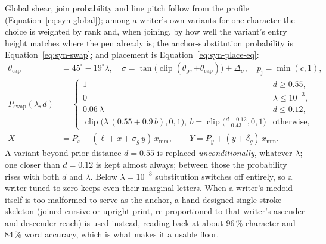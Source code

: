 Global shear, join probability and line pitch follow from the profile (Equation~\ref{eq:syn-global}); among a writer's own variants for one character the choice is weighted by rank and, when joining, by how well the variant's entry height matches where the pen already is; the anchor-substitution probability is Equation~\ref{eq:syn-swap}; and placement is Equation~\ref{eq:syn-place-eq}:
\begin{align}
\theta_{\mathrm{cap}}&=45^\circ-19^\circ\lambda,\quad\sigma=\tan\!\bigl(\operatorname{clip}(\theta_{\mathrm p},\pm\theta_{\mathrm{cap}})\bigr)+\Delta_\sigma,\quad p_{\mathrm j}=\min(c,1),\label{eq:syn-global}\\
P_{\mathrm{swap}}(\lambda,d)&=\begin{cases}1&d\ge0.55,\\0&\lambda\le10^{-3},\\0.06\,\lambda&d\le0.12,\\\operatorname{clip}\bigl(\lambda\,(0.55+0.9\,b),0,1\bigr),\ b=\operatorname{clip}\bigl(\tfrac{d-0.12}{0.43},0,1\bigr)&\text{otherwise,}\end{cases}\label{eq:syn-swap}\\
X&=P_x+(\ell+x+\sigma_g\,y)\,x_{\mathrm{mm}},\qquad Y=P_y+(y+\delta_g)\,x_{\mathrm{mm}}.\label{eq:syn-place-eq}
\end{align}
A variant beyond prior distance $d=0.55$ is replaced \emph{unconditionally}, whatever $\lambda$; one closer than $d=0.12$ is kept almost always; between those the probability rises with both $d$ and $\lambda$. Below $\lambda=10^{-3}$ substitution switches off entirely, so a writer tuned to zero keeps even their marginal letters. When a writer's medoid itself is too malformed to serve as the anchor, a hand-designed single-stroke skeleton (joined cursive or upright print, re-proportioned to that writer's ascender and descender reach) is used instead, reading back at about 96\,\% character and 84\,\% word accuracy, which is what makes it a usable floor.

